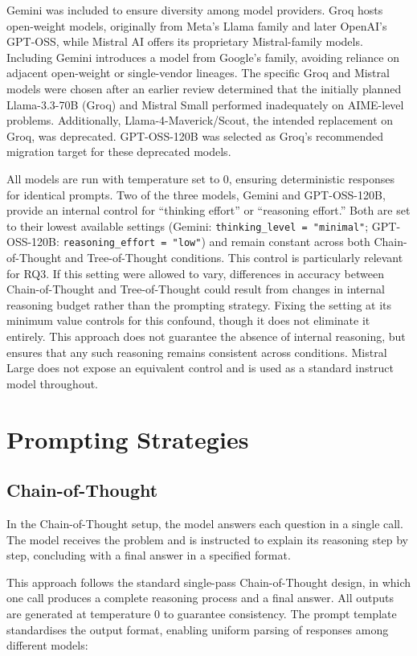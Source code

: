 Gemini was included to ensure diversity among model providers. Groq hosts
open-weight models, originally from Meta's Llama family and later
OpenAI's GPT-OSS, while Mistral AI offers its proprietary Mistral-family
models. Including Gemini introduces a model from Google's family,
avoiding reliance on adjacent open-weight or single-vendor lineages. The
specific Groq and Mistral models were chosen after an earlier review
determined that the initially planned Llama-3.3-70B (Groq) and Mistral
Small performed inadequately on AIME-level problems. Additionally,
Llama-4-Maverick/Scout, the intended replacement on Groq, was deprecated.
GPT-OSS-120B was selected as Groq's recommended migration target for
these deprecated models.

All models are run with temperature set to 0, ensuring deterministic
responses for identical prompts. Two of the three models, Gemini and
GPT-OSS-120B, provide an internal control for ``thinking effort'' or
``reasoning effort.'' Both are set to their lowest available settings
(Gemini: \texttt{thinking\_level = "minimal"}; GPT-OSS-120B:
\texttt{reasoning\_effort = "low"}) and remain constant across both
Chain-of-Thought and Tree-of-Thought conditions. This control is
particularly relevant for RQ3. If this setting were allowed to vary,
differences in accuracy between Chain-of-Thought and Tree-of-Thought
could result from changes in internal reasoning budget rather than the
prompting strategy. Fixing the setting at its minimum value controls for
this confound, though it does not eliminate it entirely. This approach
does not guarantee the absence of internal reasoning, but ensures that
any such reasoning remains consistent across conditions. Mistral Large
does not expose an equivalent control and is used as a standard instruct
model throughout.

\section{Prompting Strategies}
\label{sec:prompting}
\subsection{Chain-of-Thought}

In the Chain-of-Thought setup, the model answers each question in a
single call. The model receives the problem and is instructed to explain
its reasoning step by step, concluding with a final answer in a
specified format.

This approach follows the standard single-pass Chain-of-Thought design,
in which one call produces a complete reasoning process and a final
answer. All outputs are generated at temperature 0 to guarantee
consistency. The prompt template standardises the output format,
enabling uniform parsing of responses among different models:


